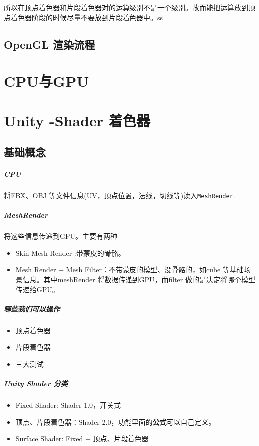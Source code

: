 \documentclass[UTF8,a4paper,12pt]{ctexbook}
\begin{document}
				所以在顶点着色器和片段着色器对的运算级别不是一个级别。故而能把运算放到顶点着色器阶段的时候尽量不要放到片段着色器中。ss
				
	\section{OpenGL 渲染流程}
			
		
\chapter{CPU与GPU}
	


\chapter{Unity -Shader 着色器}
	\section{基础概念}
		\paragraph{CPU} 将FBX、OBJ 等文件信息(UV，顶点位置，法线，切线等)读入\verb|MeshRender|.
		
		\paragraph{MeshRender} 将这些信息传递到GPU。主要有两种
			\begin{itemize}
				\item Skin Mesh Render :带蒙皮的骨骼。
				\item Mesh Render + Mesh Filter：不带蒙皮的模型、没骨骼的，如cube 等基础场景信息。其中meshRender 将数据传递到GPU，而filter 做的是决定将哪个模型传递给GPU。
			\end{itemize}
		
		\paragraph{哪些我们可以操作}
			\begin{itemize}
				\item 顶点着色器
				\item 片段着色器
				\item 三大测试
			\end{itemize}
	
		\paragraph{Unity Shader 分类}
			\begin{itemize}
				\item Fixed Shader: Shader 1.0，开关式
				\item 顶点、片段着色器：Shader 2.0，功能里面的\textbf{公式}可以自己定义。
				\item Surface Shader: Fixed + 顶点、片段着色器
			\end{itemize}	
				
\end{document}
